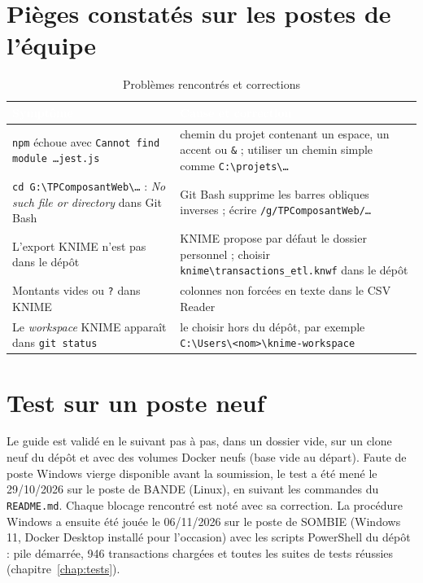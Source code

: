 \section{Pièges constatés sur les postes de l'équipe}
\begin{table}[H]
\centering\small
\caption{Problèmes rencontrés et corrections}
\label{tab:pieges-installation}
\begin{tabularx}{\linewidth}{|X|X|}
\hline
\rowcolor{bluedark}\textcolor{white}{\textbf{Symptôme}} & \textcolor{white}{\textbf{Cause et correction}} \\
\hline
\texttt{npm} échoue avec \texttt{Cannot find module \ldots jest.js} & chemin du projet contenant un espace, un accent ou \texttt{\&} ; utiliser un chemin simple comme \texttt{C:\textbackslash projets\textbackslash \ldots} \\
\hline
\texttt{cd G:\textbackslash TPComposantWeb\textbackslash \ldots} : \emph{No such file or directory} dans Git Bash & Git Bash supprime les barres obliques inverses ; écrire \texttt{/g/TPComposantWeb/\ldots} \\
\hline
L'export KNIME n'est pas dans le dépôt & KNIME propose par défaut le dossier personnel ; choisir \texttt{knime\textbackslash transactions\_etl.knwf} dans le dépôt \\
\hline
Montants vides ou \texttt{?} dans KNIME & colonnes non forcées en texte dans le CSV Reader \\
\hline
Le \emph{workspace} KNIME apparaît dans \texttt{git status} & le choisir hors du dépôt, par exemple \texttt{C:\textbackslash Users\textbackslash <nom>\textbackslash knime-workspace} \\
\hline
\end{tabularx}
\end{table}

\section{Test sur un poste neuf}
Le guide est validé en le suivant pas à pas, dans un dossier vide, sur un clone neuf du dépôt et
avec des volumes Docker neufs (base vide au départ). Faute de poste Windows vierge disponible avant
la soumission, le test a été mené le 29/10/2026 sur le poste de BANDE (Linux), en suivant les
commandes du \texttt{README.md}. Chaque blocage rencontré est noté avec sa correction. La procédure
Windows a ensuite été jouée le 06/11/2026 sur le poste de SOMBIE (Windows 11, Docker Desktop
installé pour l'occasion) avec les scripts PowerShell du dépôt : pile démarrée, 946 transactions
chargées et toutes les suites de tests réussies (chapitre~\ref{chap:tests}).

